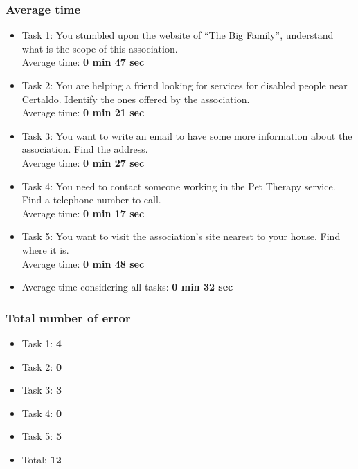 \subsubsection{Average time}
\begin{itemize}

\item Task 1: You stumbled upon the website of ``The Big Family'', understand what is the scope of this association.\\
Average time: \textbf{0 min 47 sec}

\item Task 2: You are helping a friend looking for services for disabled people near Certaldo. Identify the ones offered by the association.\\
Average time: \textbf{0 min 21 sec}

\item Task 3: You want to write an email to have some more information about the association. Find the address.\\
Average time: \textbf{0 min 27 sec}

\item Task 4: You need to contact someone working in the Pet Therapy service. Find a telephone number to call.\\
Average time: \textbf{0 min 17 sec}

\item Task 5: You want to visit the association’s site nearest to your house. Find where it is.\\
Average time: \textbf{0 min 48 sec}

\item Average time considering all tasks: \textbf{0 min 32 sec}
\end{itemize}

\subsubsection{Total number of error}
\begin{itemize}
\item Task 1: \textbf{4}
\item Task 2: \textbf{0}
\item Task 3: \textbf{3}
\item Task 4: \textbf{0}
\item Task 5: \textbf{5}
\item Total: \textbf{12}
\end{itemize}


